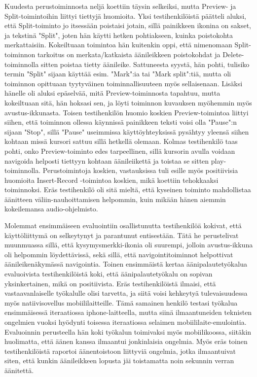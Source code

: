 \documentclass[utf8]{gradu3}
\begin{document}
Kuudesta perustoiminnosta neljä koettiin täysin selkeiksi, mutta Preview- ja Split-toimintoihin liittyi tiettyjä huomioita. Yksi testihenkilöistä päätteli aluksi, että Split-toiminto jo itsessään  poistaisi jotain, sillä painikkeen ikonina on sakset, ja tekstinä "Split", joten hän käytti hetken pohtiakseen, kuinka poistokohta merkattaisiin. Kokeiltuaan toimintoa hän kuitenkin oppi, että nimenomaan Split-toiminnon tarkoitus on merkata/katkaista äänileikkeen poistokohdat ja Delete-toiminnolla sitten poistaa tietty äänileike. Sattuneesta syystä, hän pohti, tulisiko termin "Split" sijaan käyttää esim. "Mark":ia tai "Mark split":tiä, mutta oli toiminnon opittuaan tyytyväinen toiminnallisuuteen myös sellaisenaan. Lisäksi hänelle oli aluksi epäselvää, mitä Preview-toiminnosta tapahtuu, mutta kokeiltuaan sitä, hän hoksasi sen, ja löyti toiminnon kuvauksen myöhemmin myös avustus-ikkunasta. Toisen testihenkilön huomio koskien Preview-toimintoa liittyi siihen, että toiminnon ollessa käynnissä painikkeen teksti voisi olla "Pause":n sijaan "Stop", sillä "Pause" useimmissa käyttöyhteyksissä pysähtyy yleensä siihen kohtaan missä kursori sattuu sillä hetkellä olemaan. Kolmas testihenkilö taas pohti, onko Preview-toiminto edes tarpeellinen, sillä kursorin avulla voidaan navigoida helposti tiettyyn kohtaan äänileiikettä ja toistaa se sitten play-toiminnolla. Perustoimintoja koskien, vastauksissa tuli esille myös positiivisia huomioita Insert-Record -toimintoa koskien, mikä koettiin tehokkaaksi toiminnoksi. Eräs testihenkilö oli sitä mieltä, että kyseinen toiminto mahdollistaa äänitteen väliin-nauhoittamisen helpommin, kuin mikään hänen aiemmin kokeilemansa audio-ohjelmisto.

Molemmat ensimmäiseen evaluointiin osallistunutta testihenkilöä kokivat, että käyttöliittymä on selkeytynyt ja parantunut entisestään. Tätä he perustelivat muunmuassa sillä, että kysymysmerkki-ikonia oli suurempi, jolloin avustus-ikkuna oli helpommin löydettävissä, sekä sillä, että navigointitoiminnot helpottivat äänileikenäkymässä navigointia. Toinen ensimmäistä kertaa äänipalautetyökalua evaluoivista testihenkilöistä koki, että äänipalautetyökalu on sopivan yksinkertainen, mikä on positiivista. Eräs testihenkilöistä ilmaisi, että vastaavanlaiselle työkalulle olisi tarvetta, ja siitä voisi kehkeytyä tulevaisuudessa myös natiivisovellus mobiililaitteille. Tämä samainen henkilö testasi työkalua ensimmäisessä iteraatiossa iphone-laitteella, mutta siinä ilmaantuneiden teknisten ongelmien vuoksi hyödynti toisessa iteraatiossa selaimen mobiililaite-emulointia. Evaluoinnin perusteella hän koki työkalun toimivaksi myös mobiilikoossa, siitäkin huolimatta, että äänen kanssa ilmaantui jonkinlaisia ongelmia. Myös eräs toinen testihenkilöistä raportoi äänentoistoon liittyviä ongelmia, jotka ilmaantuivat siten, että kunkin äänileikkeen lopusta jäi toistamatta noin sekunnin verran äänitettä.
\end{document}
